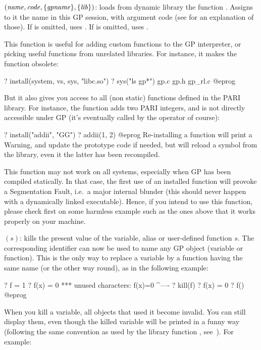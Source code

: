 $(\hbox{\it name\/},\hbox{\it code\/},\{\hbox{\it gpname\/}\},\{\hbox{\it lib\/}\})$:
loads from dynamic library  the function . Assigns to it
the name  in this GP session, with argument code  (see
 for an explanation of those). If  is
omitted, uses . If  is omitted, uses
.\label{se:install}

This function is useful for adding custom functions to the GP interpreter,
or picking useful functions from unrelated libraries. For instance, it
makes the function  obsolete:

\bprog
? install(system, vs, sys, "libc.so")
? sys("ls gp*")
gp.c            gp.h            gp_rl.c
@eprog

But it also gives you access to all (non static) functions defined in the
PARI library. For instance, the function  adds
two PARI integers, and is not directly accessible under GP (it's eventually
called by the \kbd{+} operator of course):

\bprog
? install("addii", "GG")
? addii(1, 2)
@eprog
Re-installing a function will print a Warning, and update the prototype code
if needed, but will reload a symbol from the library, even it the latter has
been recompiled.

 This function may not work on all systems, especially
when GP has been compiled statically. In that case, the first use of an
installed function will provoke a Segmentation Fault, i.e.~a major internal
blunder (this should never happen with a dynamically linked executable).
Hence, if you intend to use this function, please check first on some
harmless example such as the ones above that it works properly on your
machine.

$(s)$:\label{se:kill} kills the present value of the
variable, alias or user-defined function $s$. The corresponding identifier
can now be used to name any GP object (variable or function). This is the
only way to replace a variable by a function having the same name (or the
other way round), as in the following example:

\bprog
? f = 1
? f(x) = 0
  ***   unused characters: f(x)=0
                            ^----
? kill(f)
? f(x) = 0
? f()
@eprog

  When you kill a variable, all objects that used it become invalid. You
can still display them, even though the killed variable will be printed in a
funny way (following the same convention as used by the library function
, see~). For example:

